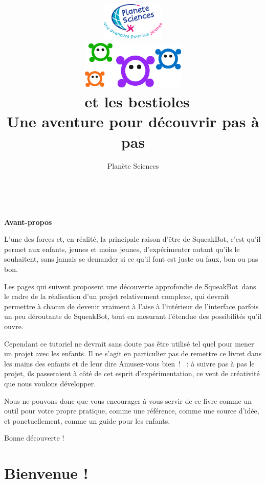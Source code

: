 \documentclass[a4paper,12pt]{book}
\title{
	\includegraphics[width=3cm]{national.png}\\
	\vfill
	\includegraphics[width=5cm]{bestioles.png}\\
	\vspace{3em}
	\LARGE{\textbf{\appName~et les bestioles}}\\[1cm]
	\large{Une aventure pour découvrir pas à pas \appName}\\[1cm]
	\vfill
}
\author{
Planète Sciences
}
\def\appName{SqueakBot}
\begin{document}

\maketitle

\tableofcontents


\clearpage
~
\vfill
\begin{center}
    \LARGE{\textbf{Avant-propos}}
\end{center}

\vspace{3em}

L'une des forces et, en réalité, la principale raison d'être de \appName, c'est qu'il permet aux enfants, jeunes et moins jeunes, d'expérimenter autant qu'ils le souhaitent, sans jamais se demander si ce qu'il font est juste ou faux, bon ou pas bon.

Les pages qui suivent proposent une découverte approfondie de \appName~dans le cadre de la réalisation d'un projet relativement complexe, qui devrait permettre à chacun de devenir vraiment à l'aise à l'intérieur de l'interface parfois un peu déroutante de \appName, tout en mesurant l'étendue des possibilités qu'il ouvre.

Cependant ce tutoriel ne devrait sans doute pas être utilisé tel quel pour mener un projet avec les enfants. Il ne s'agit en particulier pas de remettre ce livret dans les mains des enfants et de leur dire \og Amusez-vous bien~! \fg~: à suivre pas à pas le projet, ils passeraient à côté de cet esprit d'expérimentation, ce vent de créativité que nous voulons développer.

Nous ne pouvons donc que vous encourager à vous servir de ce livre comme un outil pour votre propre pratique, comme une référence, comme une source d'idée, et ponctuellement, comme un guide pour les enfants.

Bonne découverte !

\vfill

\chapter{Bienvenue !}
\end{document}
